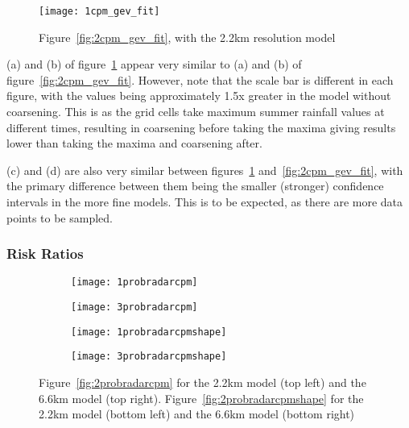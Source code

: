 \begin{figure}[H]
    \centering
    \texttt{[image: 1cpm\_gev\_fit]}
    \caption{Figure~\ref{fig:2cpm_gev_fit}, with the 2.2km resolution model}
    \label{fig:1cpm_gev_fit}
\end{figure}

(a) and (b) of figure~\ref{fig:1cpm_gev_fit} appear very similar to
    (a) and (b) of figure~\ref{fig:2cpm_gev_fit}.
However, note that the scale bar is different in each figure,
    with the values being approximately 1.5x greater in the model without coarsening.
This is as the grid cells take maximum summer rainfall values at different times,
    resulting in coarsening before taking the maxima giving results lower than taking the maxima and coarsening after.

(c) and (d) are also very similar between figures~\ref{fig:1cpm_gev_fit} and~\ref{fig:2cpm_gev_fit},
    with the primary difference between them being the smaller (stronger) confidence intervals in the more fine models.
This is to be expected, as there are more data points to be sampled.

\subsubsection{Risk Ratios}

\begin{figure}[H]
    \centering
    \begin{subfigure}{0.48\textwidth}
        \centering
        \texttt{[image: 1probradarcpm]}
    \end{subfigure}
    \hfill
    \begin{subfigure}{0.48\textwidth}
        \centering
        \texttt{[image: 3probradarcpm]}
    \end{subfigure}
    \begin{subfigure}{0.48\textwidth}
        \centering
        \texttt{[image: 1probradarcpmshape]}
    \end{subfigure}
    \hfill
    \begin{subfigure}{0.48\textwidth}
        \centering
        \texttt{[image: 3probradarcpmshape]}
    \end{subfigure}
    \caption{Figure~\ref{fig:2probradarcpm} for the 2.2km model (top left) and the 6.6km model (top right).
    Figure~\ref{fig:2probradarcpmshape} for the 2.2km model (bottom left) and the 6.6km model (bottom right)}
    \label{fig:13probradarcpm}
\end{figure}

